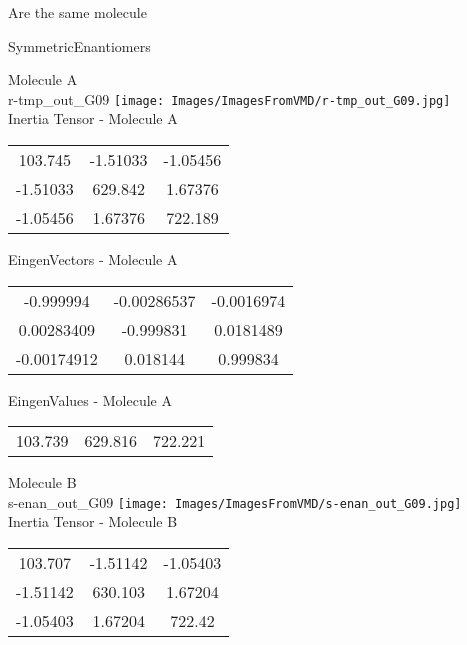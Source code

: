 \begin{center}
\vtab
\vtab
\textcolor{NavyBlue}{\Large Are the same molecule}
\end{center}
\newpage

\vtab[-2cm]
\begin{center}
{\large SymmetricEnantiomers}
\end{center}
\begin{multicols}{2}
\begin{center}
Molecule A \\ 
r-tmp\_out\_G09
\texttt{[image: Images/ImagesFromVMD/r-tmp\_out\_G09.jpg]}
\\
Inertia Tensor - Molecule A \\
\vtab
\begin{tabular}{|c c c|}
103.745	 & 	-1.51033	 & 	-1.05456	 \\
-1.51033	 & 	629.842	 & 	1.67376	 \\
-1.05456	 & 	1.67376	 & 	722.189
\end{tabular}

\vtab
 EingenVectors - Molecule A     \\
\vtab
\begin{tabular}{|c c c|}
-0.999994	 & 	-0.00286537	 & 	-0.0016974	 \\
0.00283409	 & 	-0.999831	 & 	0.0181489	 \\
-0.00174912	 & 	0.018144	 & 	0.999834
\end{tabular}

\vtab
 EingenValues - Molecule A     \\
\vtab
\begin{tabular}{|c c c|}
103.739	 & 	629.816	 & 	722.221
\end{tabular}
\columnbreak

Molecule B \\ 
s-enan\_out\_G09
\texttt{[image: Images/ImagesFromVMD/s-enan\_out\_G09.jpg]}
\\
Inertia Tensor - Molecule B \\
\vtab
\begin{tabular}{|c c c|}
103.707	 & 	-1.51142	 & 	-1.05403	 \\
-1.51142	 & 	630.103	 & 	1.67204	 \\
-1.05403	 & 	1.67204	 & 	722.42
\end{tabular}


\end{center}
\end{multicols}
